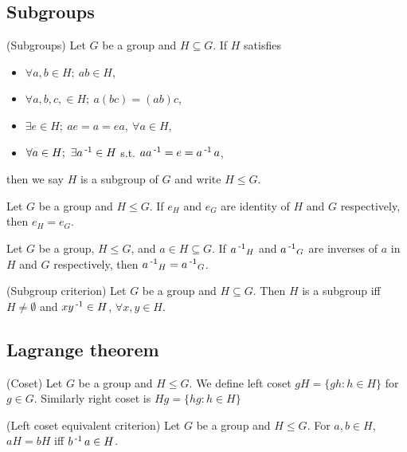 \documentclass[12pt]{article}
\begin{document}
\subsection{Subgroups}
	\begin{define}\label{definition-of-subgroup}
		(Subgroups) Let $G$ be a group and $H\subseteq G$. If $H$ satisfies
		\begin{itemize}
			\item $\forall a,b \in H;\ ab\in H$,
			\item $\forall a,b,c,\in H;\ a(bc) = (ab)c$,
			\item $\exists e\in H;\ ae=a=ea,\ \forall a\in H$,
			\item $\forall a\in H;\ \exists a\operatorname{^{-1}}\in H$ s.t. $aa\operatorname{^{-1}}=e=a\operatorname{^{-1}} a$,
		\end{itemize}
		then we say $H$ is a subgroup of $G$ and write $H\leq G$.
	\end{define}

	\begin{theorem}
		Let $G$ be a group and $H\leq G$. If $e_H$ and $e_G$ are identity of $H$ and $G$ respectively, then $e_H=e_G$.
	\end{theorem}

	\begin{theorem}
		Let $G$ be a group, $H\leq G$, and $a\in H \subseteq G$. If $a\operatorname{^{-1}}_H$ and $a\operatorname{^{-1}}_G$ are inverses of $a$ in $H$ and $G$ respectively, then $a\operatorname{^{-1}}_H=a\operatorname{^{-1}}_G$.
	\end{theorem}

	\begin{theorem}
		(Subgroup criterion) Let $G$ be a group and $H \subseteq G$. Then $H$ is a subgroup iff $H\neq \emptyset$ and $xy\operatorname{^{-1}} \in H$, $\forall x,y\in H$.
	\end{theorem}

\subsection{Lagrange theorem}
	\begin{define}
		(Coset) Let $G$ be a group and $H\leq G$. We define left coset $gH = \{gh : h\in H\}$ for $g\in G$. Similarly right coset is $Hg = \{hg : h\in H\}$
	\end{define}

	\begin{theorem}
		(Left coset equivalent criterion) Let $G$ be a group and $H\leq G$. For $a,b\in H$, $aH=bH$ iff $b\operatorname{^{-1}} a \in H$.
	\end{theorem}
\end{document}
